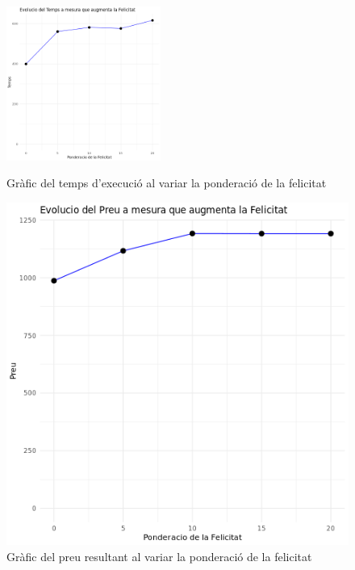 \documentclass[a4paper]{article}
\begin{document}
\begin{table}[ht]
	\begin{figure}[H]
		\centering
		\includegraphics[width=0.45\textwidth]{images/exp6b_grafic.png}
		\caption{Gràfic del temps d'execució al variar la ponderació de la felicitat}
		\label{fig:exp6b_grafic}
		\begin{minipage}{0.45\textwidth}
			\centering
			\includegraphics[width=\textwidth]{images/exp6_grafic.png}
			\caption{Gràfic del preu resultant al variar la ponderació de la felicitat}
			\label{fig:exp6a_grafic}
		\end{minipage} \hfill
		\begin{minipage}{0.45\textwidth}
			\centering

\end{minipage}
\end{figure}
\end{table}
\end{document}
